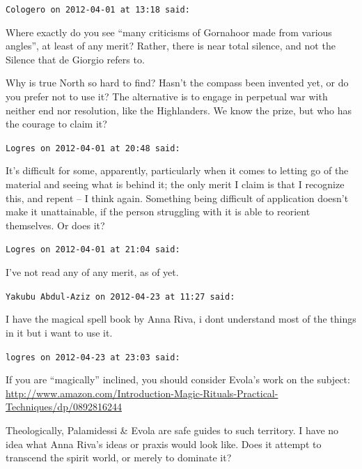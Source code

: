 \begin{footnotesize}
\begin{sffamily}
\texttt{Cologero on 2012-04-01 at 13:18 said:}

Where exactly do you see ``many criticisms of Gornahoor made from various angles'', at least of any merit? Rather, there is near total silence, and not the Silence that de Giorgio refers to.

Why is true North so hard to find? Hasn't the compass been invented yet, or do you prefer not to use it? The alternative is to engage in perpetual war with neither end nor resolution, like the Highlanders. We know the prize, but who has the courage to claim it?

\hfill

\texttt{Logres on 2012-04-01 at 20:48 said:}

It's difficult for some, apparently, particularly when it comes to letting go of the material and seeing what is behind it; the only merit I claim is that I recognize this, and repent -- I think again. Something being difficult of application doesn't make it unattainable, if the person struggling with it is able to reorient themselves. Or does it?

\hfill

\texttt{Logres on 2012-04-01 at 21:04 said:}

I've not read any of any merit, as of yet.

\hfill

\texttt{Yakubu Abdul-Aziz on 2012-04-23 at 11:27 said:}

I have the magical spell book by Anna Riva, i dont understand most of the things in it but i want to use it.

\hfill

\texttt{logres on 2012-04-23 at 23:03 said:}

If you are ``magically'' inclined, you should consider Evola's work on the subject:
\url{http://www.amazon.com/Introduction-Magic-Rituals-Practical-Techniques/dp/0892816244}

Theologically, Palamidessi \& Evola are safe guides to such territory. I have no idea what Anna Riva's ideas or praxis would look like. Does it attempt to transcend the spirit world, or merely to dominate it?

\end{sffamily}
\end{footnotesize}

